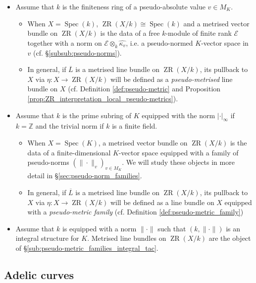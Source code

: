 \documentclass [11pt,reqno]{amsart}
\def\bZ{{\mathbb{Z}}}
\newcommand{\1}{\mathmybb{1}}
\def\cE{{\mathcal{E}}}
\def\Spec{\operatorname{Spec}}
\def\ZR{\operatorname{ZR}}
\begin{document}
\begin{example}
\label{example:metrised_vector_bundle_ZR}
\begin{itemize}
	\item[(1)] Assume that $k$ is the finiteness ring of a pseudo-absolute value $v\in M_{K}$. 
		\begin{itemize}
			\item[(i)] When $X=\Spec(k)$, $\ZR(X/k)\cong \Spec(k)$ and a metrised vector bundle on $\ZR(X/k)$ is the data of a free $k$-module of finite rank $\cE$ together with a norm on $\cE \otimes_{k}\widehat{\kappa_{v}}$, i.e. a pseudo-normed $K$-vector space in $v$ (cf. \S \ref{subsub:pseudo-norms}).
			\item[(ii)] In general, if $\overline{L}$ is a metrised line bundle on $\ZR(X/k)$, its pullback to $X$ via $\eta : X \to \ZR(X/k)$ will be defined as a \emph{pseudo-metrised} line bundle on $X$ (cf. Definition \ref{def:pseudo-metric} and Proposition \ref{prop:ZR_interpretation_local_pseudo-metrics}).
		\end{itemize}			
		\item[(2)] Assume that $k$ is the prime subring of $K$ equipped with the norm $|\cdot|_{\infty}$ if $k=\bZ$ and the trivial norm if $k$ is a finite field. 
			\begin{itemize}
				\item[(i)] When $X=\Spec(K)$, a metrised vector bundle on $\ZR(X/k)$ is the data of a finite-dimensional $K$-vector space equipped with a family of pseudo-norms $(\|\cdot\|_{v})_{v\in M_{K}}$. We will study these objects in more detail in \S \ref{sec:pseudo-norm_families}.
				\item[(ii)] In general, if $\overline{L}$ is a metrised line bundle on $\ZR(X/k)$, its pullback to $X$ via $\eta : X \to \ZR(X/k)$ will be defined as a line bundle on $X$ equipped with a \emph{pseudo-metric family} (cf. Definition \ref{def:pseudo-metric_family})
			\end{itemize}
		\item[(3)] Assume that $k$ is equipped with a norm $\|\cdot\|$ such that $(k,\|\cdot\|)$ is an integral structure for $K$. Metrised line bundles on $\ZR(X/k)$ are the object of \S \ref{sub:pseudo-metric_families_integral_tac}.
\end{itemize}
\end{example}

\subsection{Adelic curves}
\label{sub:reminder_adelic_curves}
\end{document}
